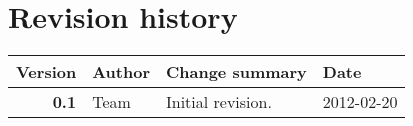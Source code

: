 
\section{Revision history}
\sectionrule

\begin{tabular}{ | r | l  p{4in}  l | }
\toprule
\textbf{Version}	& \textbf{Author}	& \textbf{Change summary}	& \textbf{Date} \\
\midrule
\textbf{0.1}		& Team			& Initial revision.		& 2012-02-20 \\
\bottomrule
\end{tabular}